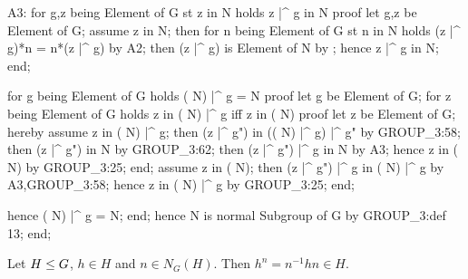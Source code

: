  A3: for g,z being Element of G st z in  N
  holds z |^ g in  N
  proof
    let g,z be Element of G;
    assume z in  N;
    then for n being Element of G st n in N holds
    (z |^ g)*n = n*(z |^ g) by A2;
    then (z |^ g) is Element of  N by ;
    hence z |^ g in  N;
  end;


  for g being Element of G holds ( N) |^ g =  N
  proof
    let g be Element of G;
    for z being Element of G
    holds z in ( N) |^ g iff z in ( N)
    proof
      let z be Element of G;
      hereby
        assume z in ( N) |^ g;
        then (z |^ g") in (( N) |^ g) |^ g" by GROUP_3:58;
        then (z |^ g") in  N by GROUP_3:62;
        then (z |^ g") |^ g in  N by A3;
        hence z in ( N) by GROUP_3:25;
      end;
      assume z in ( N);
      then (z |^ g") |^ g in ( N) |^ g by A3,GROUP_3:58;
      hence z in ( N) |^ g by GROUP_3:25;
    end;

    hence ( N) |^ g =  N;
  end;
  hence  N is normal Subgroup of G by GROUP_3:def 13;
end;
\eatline
{}\nwendcode{}\nwdocspar
\begin{theorem}
Let $H\leq G$, $h\in H$ and $n\in N_{G}(H)$. Then
$h^{n}=n^{-1}hn\in H$.
\end{theorem}

